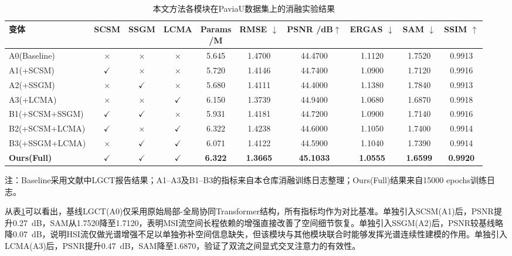 \documentclass[UTF8,a4paper,11pt]{ctexart}
\newcommand{\best}[1]{\textbf{#1}}
\begin{document}
\begin{table}[!htbp]
\centering\footnotesize
\caption{本文方法各模块在PaviaU数据集上的消融实验结果}
\label{tab:ablation}
\setlength{\tabcolsep}{3.6pt}
\begin{tabular}{@{}lccc@{\quad}cccccc@{}}
\toprule
变体 & SCSM & SSGM & LCMA & \makecell[c]{Params\\/M} & \makecell[c]{RMSE\\$\downarrow$} &
  \makecell[c]{PSNR\\/dB$\uparrow$} & \makecell[c]{ERGAS\\$\downarrow$} &
  \makecell[c]{SAM\\$\downarrow$} & \makecell[c]{SSIM\\$\uparrow$} \\
\midrule
A0(Baseline)     & $\times$ & $\times$ & $\times$ & 5.645 & 1.4700 & 44.4700 & 1.1120 & 1.7520 & 0.9913 \\
A1(+SCSM)        & $\checkmark$ & $\times$ & $\times$ & 5.720 & 1.4146 & 44.7400 & 1.0900 & 1.7120 & 0.9916 \\
A2(+SSGM)        & $\times$ & $\checkmark$ & $\times$ & 5.680 & 1.4111 & 44.4000 & 1.1380 & 1.7840 & 0.9913 \\
A3(+LCMA)        & $\times$ & $\times$ & $\checkmark$ & 6.150 & 1.3739 & 44.9400 & 1.0680 & 1.6870 & 0.9918 \\
B1(+SCSM+SSGM)   & $\checkmark$ & $\checkmark$ & $\times$ & 5.931 & 1.4181 & 44.7200 & 1.0900 & 1.7140 & 0.9916 \\
B2(+SCSM+LCMA)   & $\checkmark$ & $\times$ & $\checkmark$ & 6.322 & 1.4238 & 44.6000 & 1.1050 & 1.7400 & 0.9914 \\
B3(+SSGM+LCMA)   & $\times$ & $\checkmark$ & $\checkmark$ & 6.071 & 1.4122 & 44.5900 & 1.1040 & 1.7390 & 0.9914 \\
\textbf{Ours(Full)} & $\checkmark$ & $\checkmark$ & $\checkmark$ & \best{6.322} & \best{1.3665} & \best{45.1033} & \best{1.0555} & \best{1.6599} & \best{0.9920} \\
\bottomrule
\end{tabular}

\vspace{4pt}
{\footnotesize 注：Baseline采用文献\cite{ref13}中LGCT报告结果；A1--A3及B1--B3的指标来自本仓库消融训练日志整理；Ours(Full)结果来自15000 epochs训练日志。}
\end{table}

从表\ref{tab:ablation}可以看出，基线LGCT(A0)仅采用原始局部-全局协同Transformer结构，所有指标均作为对比基准。单独引入SCSM(A1)后，PSNR提升0.27~dB，SAM从1.7520降至1.7120，表明MSI流空间长程依赖的增强直接改善了空间细节恢复。单独引入SSGM(A2)后，PSNR较基线略降0.07~dB，说明HSI流仅做光谱增强不足以单独弥补空间信息缺失，但该模块与其他模块联合时能够发挥光谱连续性建模的作用。单独引入LCMA(A3)后，PSNR提升0.47~dB，SAM降至1.6870，验证了双流之间显式交叉注意力的有效性。
\end{document}
